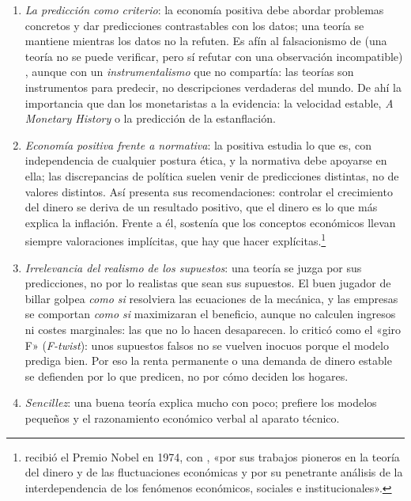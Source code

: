 \documentclass[11pt]{article}
\begin{document}
\begin{itemize}
  \begin{enumerate}
  \item \emph{La predicción como criterio}: la economía positiva debe abordar problemas concretos y dar predicciones contrastables con los datos; una teoría se mantiene mientras los datos no la refuten. Es afín al falsacionismo de  (una teoría no se puede verificar, pero sí refutar con una observación incompatible) , aunque con un \emph{instrumentalismo} que  no compartía: las teorías son instrumentos para predecir, no descripciones verdaderas del mundo\nocite{Boland1979Critique}. De ahí la importancia que dan los monetaristas a la evidencia: la velocidad estable, \emph{A Monetary History} o la predicción de la estanflación.
  \item \emph{Economía positiva frente a normativa}: la positiva estudia lo que es, con independencia de cualquier postura ética, y la normativa debe apoyarse en ella; las discrepancias de política suelen venir de predicciones distintas, no de valores distintos. Así presenta  sus recomendaciones: controlar el crecimiento del dinero se deriva de un resultado positivo, que el dinero es lo que más explica la inflación. Frente a él,  sostenía que los conceptos económicos llevan siempre valoraciones implícitas, que hay que hacer explícitas\nocite{Myrdal1953Political}.\footnote{ recibió el Premio Nobel en 1974, con , «por sus trabajos pioneros en la teoría del dinero y de las fluctuaciones económicas y por su penetrante análisis de la interdependencia de los fenómenos económicos, sociales e institucionales»\nocite{Nobel1974}.}
  \item \emph{Irrelevancia del realismo de los supuestos}: una teoría se juzga por sus predicciones, no por lo realistas que sean sus supuestos. El buen jugador de billar golpea \emph{como si} resolviera las ecuaciones de la mecánica, y las empresas se comportan \emph{como si} maximizaran el beneficio, aunque no calculen ingresos ni costes marginales: las que no lo hacen desaparecen.  lo criticó como el «giro F» (\emph{F-twist}): unos supuestos falsos no se vuelven inocuos porque el modelo prediga bien\nocite{Samuelson1963Problems}. Por eso la renta permanente o una demanda de dinero estable se defienden por lo que predicen, no por cómo deciden los hogares.
  \item \emph{Sencillez}: una buena teoría explica mucho con poco;  prefiere los modelos pequeños y el razonamiento económico verbal al aparato técnico.

\end{enumerate}
\end{itemize}
\end{document}
